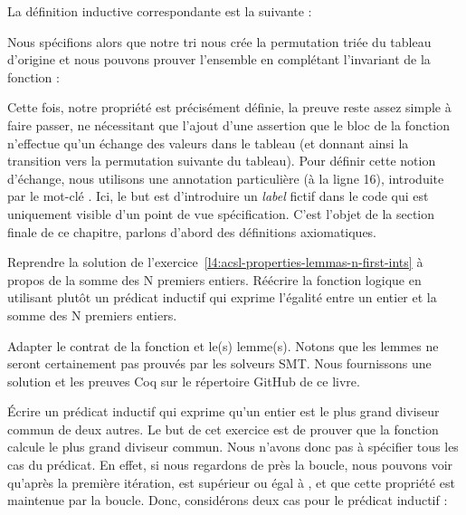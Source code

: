 La définition inductive correspondante est la suivante :






Nous spécifions alors que notre tri nous crée la permutation triée du tableau
d'origine et nous pouvons prouver l'ensemble en complétant l'invariant de la
fonction :





Cette fois, notre propriété est précisément définie, la preuve reste assez
simple à faire passer, ne nécessitant que l'ajout d'une assertion que le bloc
de la fonction n'effectue qu'un échange des valeurs dans le tableau (et donnant
ainsi la transition vers la permutation suivante du tableau). Pour définir cette
notion d'échange, nous utilisons une annotation particulière (à la ligne 16),
introduite par le mot-clé . Ici, le but est d'introduire un \textit{label}
fictif dans le code qui est uniquement visible d'un point de vue spécification.
C'est l'objet de la section finale de ce chapitre, parlons d'abord des définitions
axiomatiques.








Reprendre la solution de l'exercice~\ref{l4:acsl-properties-lemmas-n-first-ints} à
propos de la somme des N premiers entiers. Réécrire la fonction logique en utilisant
plutôt un prédicat inductif qui exprime l'égalité entre un entier et la somme des
N premiers entiers.





Adapter le contrat de la fonction et le(s) lemme(s). Notons que les lemmes ne
seront certainement pas prouvés par les solveurs SMT. Nous fournissons une solution
et les preuves Coq sur le répertoire GitHub de ce livre.





Écrire un prédicat inductif qui exprime qu'un entier est le plus grand diviseur
commun de deux autres. Le but de cet exercice est de prouver que la fonction
 calcule le plus grand diviseur commun. Nous n'avons donc pas
à spécifier tous les cas du prédicat. En effet, si nous regardons de près la boucle,
nous pouvons voir qu'après la première itération,  est supérieur ou
égal à , et que cette propriété est maintenue par la boucle. Donc,
considérons deux cas pour le prédicat inductif :

